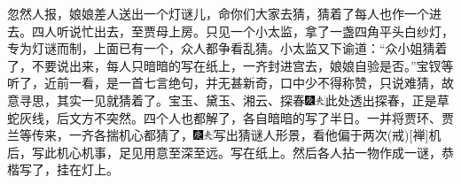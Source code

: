 忽然人报，娘娘差人送出一个灯谜儿，命你们大家去猜，猜着了每人也作一个进去。四人听说忙出去，至贾母上房。只见一个小太监，拿了一盏四角平头白纱灯，专为灯谜而制，上面已有一个，众人都争看乱猜。小太监又下谕道：``众小姐猜着了，不要说出来，每人只暗暗的写在纸上，一齐封进宫去，娘娘自验是否。''宝钗等听了，近前一看，是一首七言绝句，并无甚新奇，口中少不得称赞，只说难猜，故意寻思，其实一见就猜着了。宝玉、黛玉、湘云、探春{\includegraphics[width=3mm]{../Images/00004}\includegraphics[width=3mm]{../Images/00012}\footnotesize \kaishu 此处透出探春，正是草蛇灰线，后文方不突然。}四个人也都解了，各自暗暗的写了半日。一并将贾环、贾兰等传来，一齐各揣机心都猜了，{\includegraphics[width=3mm]{../Images/00004}\includegraphics[width=3mm]{../Images/00012}\footnotesize \kaishu 写出猜谜人形景，看他偏于两次{(戒)}{[}禅{]}机后，写此机心机事，足见用意至深至远。}写在纸上。然后各人拈一物作成一谜，恭楷写了，挂在灯上。

